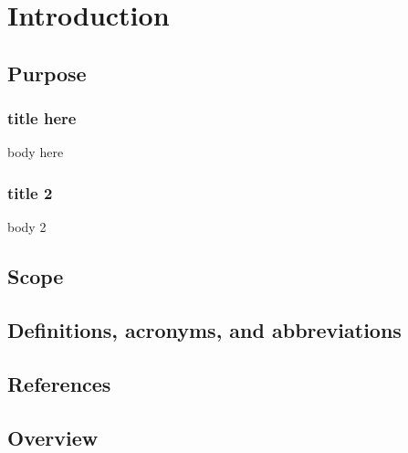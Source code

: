 
\section{Introduction}


\subsection{Purpose}

\begin{frame} %
\frametitle{title here}
body here
\end{frame}

\begin{frame}
\frametitle{title 2}
body 2
\end{frame}


\subsection{Scope}



\subsection{Definitions, acronyms, and abbreviations}



\subsection{References}



\subsection{Overview}


